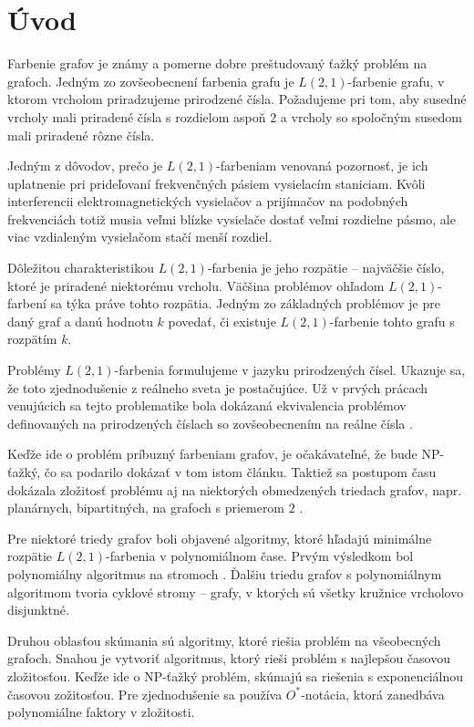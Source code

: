 \chapter*{Úvod} %

Farbenie grafov je známy a pomerne dobre preštudovaný ťažký problém na grafoch.
Jedným zo zovšeobecnení farbenia grafu je $L(2,1)$-farbenie grafu, v ktorom
vrcholom priradzujeme prirodzené čísla. Požadujeme pri tom, aby susedné
vrcholy mali priradené čísla s rozdielom aspoň $2$ a vrcholy so spoločným
susedom mali priradené rôzne čísla.

Jedným z dôvodov, prečo je $L(2,1)$-farbeniam venovaná pozornosť, je ich uplatnenie
pri prideľovaní frekvenčných pásiem vysielacím staniciam. Kvôli interferencii
elektromagnetických vysielačov a prijímačov na podobných frekvenciách totiž
musia veľmi blízke vysielače dostať veľmi rozdielne pásmo, ale viac vzdialeným
vysielačom stačí menší rozdiel.

Dôležitou charakteristikou $L(2,1)$-farbenia
je jeho rozpätie -- najväčšie číslo, ktoré je priradené niektorému vrcholu. Väčšina
problémov ohľadom $L(2,1)$-farbení sa týka práve tohto rozpätia. Jedným zo základných
problémov je pre daný graf a danú hodnotu $k$ povedať, či existuje $L(2,1)$-farbenie
tohto grafu s rozpätím $k$.

Problémy $L(2,1)$-farbenia formulujeme v jazyku prirodzených čísel. Ukazuje sa,
že toto zjednodušenie z reálneho sveta je postačujúce. Už v prvých prácach venujúcich sa tejto problematike
bola dokázaná ekvivalencia problémov definovaných na prirodzených číslach
so zovšeobecnením na reálne čísla \cite{griggs_yeh_tree}.

Keďže ide o problém príbuzný farbeniam grafov, je očakávateľné, že
bude NP-ťažký, čo sa podarilo dokázať v tom istom článku.
Taktiež sa postupom času dokázala zložitosť problému aj na niektorých obmedzených
triedach grafov, napr. planárnych, bipartitných, na grafoch s
priemerom $2$ \cite{color_survey}.

Pre niektoré triedy grafov boli objavené algoritmy, ktoré hľadajú minimálne rozpätie
$L(2,1)$-farbenia v polynomiálnom čase. Prvým výsledkom bol polynomiálny algoritmus
na stromoch \cite{chang_kuo}. Ďalšiu triedu grafov s polynomiálnym algoritmom tvoria
cyklové stromy \cite{kaktusy} -- grafy, v ktorých sú všetky kružnice vrcholovo disjunktné.

Druhou oblasťou skúmania sú algoritmy, ktoré riešia problém na všeobecných grafoch. Snahou
je vytvoriť algoritmus, ktorý rieši problém s najlepšou časovou zložitosťou. Keďže
ide o NP-ťažký problém, skúmajú sa riešenia s exponenciálnou časovou zožitosťou. Pre
zjednodušenie sa používa $O^*$-notácia, ktorá zanedbáva polynomiálne faktory v zložitosti.

